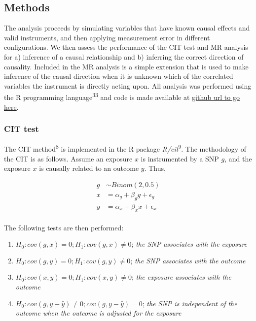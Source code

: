 \documentclass[]{article}
\providecommand{\tightlist}{%
  \setlength{\itemsep}{0pt}\setlength{\parskip}{0pt}}
\begin{document}
\subsection{Methods}\label{methods}

The analysis proceeds by simulating variables that have known causal
effects and valid instruments, and then applying measurement error in
different configurations. We then assess the performance of the CIT test
and MR analysis for a) inference of a causal relationship and b)
inferring the correct direction of causality. Included in the MR
analysis is a simple extension that is used to make inference of the
causal direction when it is unknown which of the correlated variables
the instrument is directly acting upon. All analysis was performed using
the R programming language\textsuperscript{33} and code is made
available at \href{}{github url to go here}.

\subsubsection{CIT test}\label{cit-test}

The CIT method\textsuperscript{8} is implemented in the R package
\emph{R/cit}\textsuperscript{9}. The methodology of the CIT is as
follows. Assume an exposure \(x\) is instrumented by a SNP \(g\), and
the exposure \(x\) is causally related to an outcome \(y\). Thus,

\[
\begin{aligned}
g & \sim Binom(2, 0.5) \\
x & = \alpha_g + \beta_g g + \epsilon_g \\
y & = \alpha_x + \beta_x x + \epsilon_x \\
\end{aligned}
\]

The following tests are then performed:

\begin{enumerate}
\def\labelenumi{\arabic{enumi}.}
\tightlist
\item
  \(H_0: cov(g, x) = 0; H_1: cov(g, x) \neq 0\); \emph{the SNP
  associates with the exposure}
\item
  \(H_0: cov(g, y) = 0; H_1: cov(g, y) \neq 0\); \emph{the SNP
  associates with the outcome}
\item
  \(H_0: cov(x, y) = 0; H_1: cov(x, y) \neq 0\); \emph{the exposure
  associates with the outcome}
\item
  \(H_0: cov(g, y - \hat{y}) \neq 0; cov(g, y - \hat{y}) = 0\);
  \emph{the SNP is independent of the outcome when the outcome is
  adjusted for the exposure}
\end{enumerate}
\end{document}

